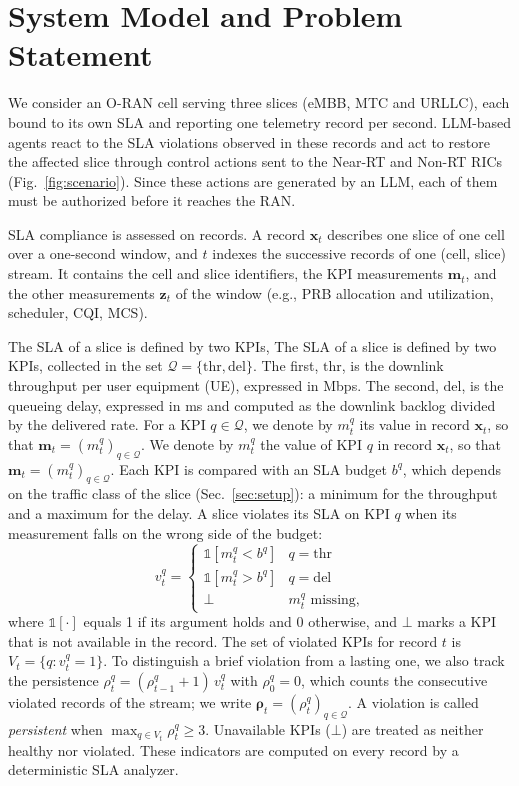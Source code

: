 \documentclass[conference]{IEEEtran}
\begin{document}
\section{System Model and Problem Statement}\label{sec:model}
We consider an O-RAN cell serving three slices (eMBB, MTC and URLLC), each
bound to its own SLA and reporting one telemetry record per second. LLM-based
agents react to the SLA violations observed in these records and act to restore
the affected slice through control actions sent to the Near-RT and Non-RT RICs
(Fig.~\ref{fig:scenario}). Since these actions are generated by an LLM, each of
them must be authorized before it reaches the RAN.

SLA compliance is assessed on records. A record $\mathbf{x}_t$ describes one
slice of one cell over a one-second window, and $t$ indexes the successive
records of one (cell, slice) stream. It contains the cell and slice
identifiers, the KPI measurements $\mathbf{m}_t$, and the other measurements
$\mathbf{z}_t$ of the window (e.g., PRB allocation and utilization, scheduler,
CQI, MCS).

The SLA of a slice is defined by two KPIs, The SLA of a slice is defined by two KPIs, collected in the set
$\mathcal{Q}=\{\text{thr},\text{del}\}$. The first, $\text{thr}$, is the downlink throughput per user equipment (UE), expressed in Mbps. The second, $\text{del}$, is the queueing delay, expressed in ms and computed as the downlink backlog divided by the delivered rate. For a KPI $q\in\mathcal{Q}$, we denote by $m_t^q$ its value in record $\mathbf{x}_t$, so that $\mathbf{m}_t=(m_t^q)_{q\in\mathcal{Q}}$. We denote by $m_t^q$ the value of KPI $q$ in record
$\mathbf{x}_t$, so that $\mathbf{m}_t=(m_t^q)_{q\in\mathcal{Q}}$. Each KPI is
compared with an SLA budget $b^q$, which depends on the traffic class of the
slice (Sec.~\ref{sec:setup}): a minimum for the throughput and a maximum for
the delay. A slice violates its SLA on KPI $q$ when its measurement falls on
the wrong side of the budget:
\begin{equation}
v_t^q=\begin{cases}
\mathbb{1}[m_t^q<b^q] & q=\text{thr}\\
\mathbb{1}[m_t^q>b^q] & q=\text{del}\\
\bot & m_t^q\text{ missing,}
\end{cases}
\end{equation}
where $\mathbb{1}[\cdot]$ equals 1 if its argument holds and 0 otherwise, and
$\bot$ marks a KPI that is not available in the record. The set of violated
KPIs for record $t$ is $V_t=\{q: v_t^q=1\}$. To distinguish a brief violation
from a lasting one, we also track the persistence
$\rho_t^q=(\rho_{t-1}^q+1)\,v_t^q$ with $\rho_0^q=0$, which counts the
consecutive violated records of the stream; we write
$\boldsymbol{\rho}_t=(\rho_t^q)_{q\in\mathcal{Q}}$. A violation is called
\emph{persistent} when $\max_{q\in V_t}\rho_t^q\ge3$. Unavailable KPIs
($\bot$) are treated as neither healthy nor violated. These indicators are
computed on every record by a deterministic SLA analyzer.
\end{document}
